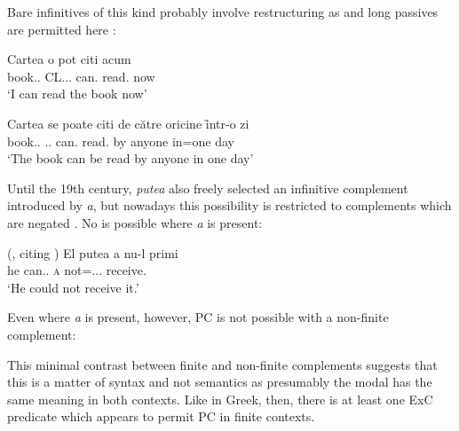 \documentclass[output=paper]{langsci/langscibook}
\begin{document}
Bare infinitives of this kind probably involve restructuring as 
and long passives are permitted here \citep[194, 196]{Dragomirescu2013}:

\ea%
    \label{ex:key:24.36}
    \sn
	\gll Cartea     o       pot   citi   acum\\
        book.\Def{}.\Acc{}   CL.\Acc{}.\glossF.\Tsg{}   can.\Fsg{}   read.\Inf{} now\\
	\glt ‘I can read the book now’
\z

\ea%
    \label{ex:key:24.37}
    \sn
	\gll Cartea     se          poate      citi   de {către oricine} ȋntr-o zi\\
    book.\Def{}.\Nom{}   \Cl.\Refl.\Pass{} can.\Tsg{} read.\Inf{}   by anyone   in=one day\\
	\glt ‘The book can be read by anyone in one day’
\z

Until the 19th century, \emph{putea} also freely selected an infinitive
complement introduced by \emph{a}, but nowadays this possibility is restricted
to complements which are negated \citep{Dragomirescu2013}. No 
is possible where \emph{a} is present:

\ea%
    \label{ex:key:24.38} (\citealt[194]{PanaDindelegan2013}, citing \citealt[60]{Jordan2009})
    \sn
	\gll El putea       a   nu-l       primi\\
    he can.\Ipfv{}.\Tsg{}   \textsc{a}   not=\Cl.\Acc{}.\M.\Tsg{}   receive.\Inf{}\\
	\glt ‘He could not receive it.’
\z

Even where \emph{a} is present, however, \gls{PC} is not possible with a non-finite complement:

\ea%
    \label{ex:key:24.39}
\z

This minimal contrast between finite and non-finite complements suggests that
this is a matter of syntax and not semantics as presumably the modal has the
same meaning in both contexts. Like in Greek, then, there is at least one
\gls{ExC} predicate which appears to permit
\gls{PC} in finite  contexts.
\end{document}
